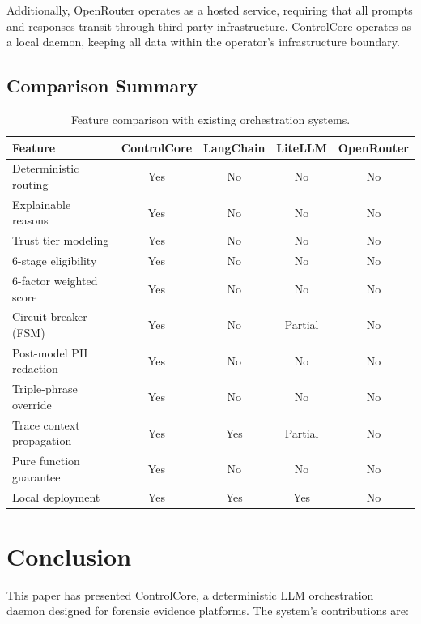 \documentclass[11pt,a4paper]{article}
\theoremstyle{plain}
\theoremstyle{definition}
\begin{document}
Additionally, OpenRouter operates as a hosted service, requiring that all
prompts and responses transit through third-party infrastructure. ControlCore
operates as a local daemon, keeping all data within the operator's
infrastructure boundary.

\subsection{Comparison Summary}

\begin{table}[H]
\centering
\caption{Feature comparison with existing orchestration systems.}
\label{tab:comparison}
\begin{tabular}{lcccc}
\toprule
\textbf{Feature} & \textbf{ControlCore} & \textbf{LangChain} & \textbf{LiteLLM} & \textbf{OpenRouter} \\
\midrule
Deterministic routing   & Yes & No  & No  & No  \\
Explainable reasons     & Yes & No  & No  & No  \\
Trust tier modeling     & Yes & No  & No  & No  \\
6-stage eligibility     & Yes & No  & No  & No  \\
6-factor weighted score & Yes & No  & No  & No  \\
Circuit breaker (FSM)   & Yes & No  & Partial & No \\
Post-model PII redaction& Yes & No  & No  & No  \\
Triple-phrase override  & Yes & No  & No  & No  \\
Trace context propagation& Yes & Yes & Partial & No \\
Pure function guarantee & Yes & No  & No  & No  \\
Local deployment        & Yes & Yes & Yes & No  \\
\bottomrule
\end{tabular}
\end{table}

\section{Conclusion}
\label{sec:conclusion}

This paper has presented ControlCore, a deterministic LLM orchestration daemon
designed for forensic evidence platforms. The system's contributions are:
\end{document}
